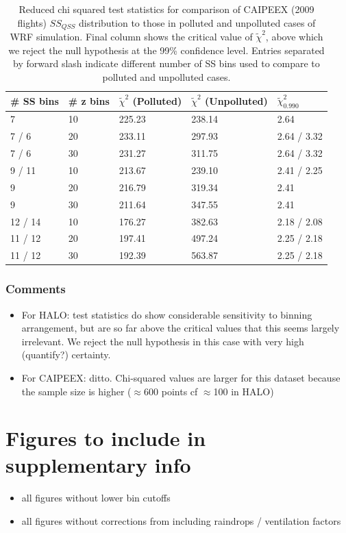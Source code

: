 \documentclass{article}
\begin{document}
\begin{table}[ht]
\centering
\begin{tabular}{@{}lllll@{}}
\toprule
\textbf{\# SS bins} & \textbf{\# z bins} & \textbf{$\tilde\chi^2$ (Polluted)} & \textbf{$\tilde\chi^2$ (Unpolluted)} & \textbf{$\tilde\chi^2_{0.990}$} \\ \midrule
7 & 10 & 225.23 & 238.14 & 2.64 \\
7 / 6 & 20 & 233.11 & 297.93 & 2.64 / 3.32 \\
7 / 6 & 30 & 231.27 & 311.75 & 2.64 / 3.32 \\
9 / 11 & 10 & 213.67 & 239.10 & 2.41 / 2.25 \\
9 & 20 & 216.79 & 319.34 & 2.41 \\
9 & 30 & 211.64 & 347.55 & 2.41 \\
12 / 14 & 10 & 176.27 & 382.63 & 2.18 / 2.08 \\
11 / 12 & 20 & 197.41 & 497.24 & 2.25 / 2.18 \\
11 / 12 & 30 & 192.39 & 563.87 & 2.25 / 2.18 \\ \bottomrule
\end{tabular}
\caption{Reduced chi squared test statistics for comparison of CAIPEEX (2009 flights) $SS_{QSS}$ distribution to those in polluted and unpolluted cases of WRF simulation. Final column shows the critical value of $\tilde\chi^2$, above which we reject the null hypothesis at the 99\% confidence level. Entries separated by forward slash indicate different number of SS bins used to compare to polluted and unpolluted cases.}
\label{caipeexchisqtable}
\end{table}
\subsubsection{Comments}
\begin{itemize}
	\item For HALO: test statistics do show considerable sensitivity to binning arrangement, but are so far above the critical values that this seems largely irrelevant. We reject the null hypothesis in this case with very high (quantify?) certainty.
	\item For CAIPEEX: ditto. Chi-squared values are larger for this dataset because the sample size is higher ($\approx$600 points cf $\approx$100 in HALO)
\end{itemize}
\clearpage
\newpage

\section{Figures to include in supplementary info}
\begin{itemize}
	\item all figures without lower bin cutoffs
	\item all figures without corrections from including raindrops / ventilation factors
\end{itemize}
\end{document}
